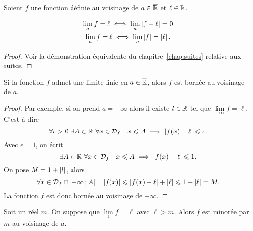Soient \(f\) une fonction définie au voisinage de \(a \in \overline{\mathbb{R}}\) et \(\ell \in
\mathbb{R}\).
\begin{prop}
  \begin{gather}
    \lim\limits_{a} f = \ell \iff \lim\limits_{a} \left\lvert f-\ell\right\rvert = 0 \\
    \lim\limits_{a} f = \ell \iff \lim\limits_{a} \left\lvert f\right\rvert=\left\lvert\ell\right\rvert.
  \end{gather}
\end{prop}
\begin{proof}
  Voir la démonstration équivalente du chapitre~\ref{chap:suites} relative aux
  suites.
\end{proof}
\begin{prop}
  Si la fonction \(f\) admet une limite finie en \(a \in \overline{\mathbb{R}}\), alors \(f\)
  est bornée au voisinage de \(a\).
\end{prop}
\begin{proof}
  Par exemple, si on prend \(a=-\infty\) alors il existe \(l \in \mathbb{R}\) tel que
  \(\lim\limits_{-\infty} f = \ell\). C'est-à-dire
  \begin{equation}
    \forall \epsilon >0 \ \exists A \in \R \ \forall x \in \Def{f} \quad x
    \leqslant A \implies \abs{f(x)-\ell} \leqslant \epsilon.
  \end{equation}
  Avec \(\epsilon=1\), on écrit
  \begin{equation}
    \exists A \in \mathbb{R} \ \forall x \in \mathcal{D}_{f} \quad x \leqslant A \implies
    \left\lvert f(x)-\ell\right\rvert \leqslant 1.
  \end{equation}
  On pose \(M=1+\left\lvert l\right\rvert\), alors
  \begin{equation}
    \forall x \in \mathcal{D}_{f} \cap \left] -\infty \, ; {} A \right] \quad \left\lvert f(x)\right\rvert
    \leqslant \left\lvert f(x)-\ell\right\rvert+\left\lvert\ell\right\rvert \leqslant 1+\left\lvert\ell\right\rvert=M.
  \end{equation}
  La fonction \(f\) est donc bornée au voisinage de \(-\infty\).
\end{proof}
\begin{prop}
  Soit un réel \(m\). On suppose que \(\lim\limits_{a} f=\ell\) avec \(\ell>m\).
  Alors \(f\) est minorée par \(m\) au voisinage de \(a\).
\end{prop}
